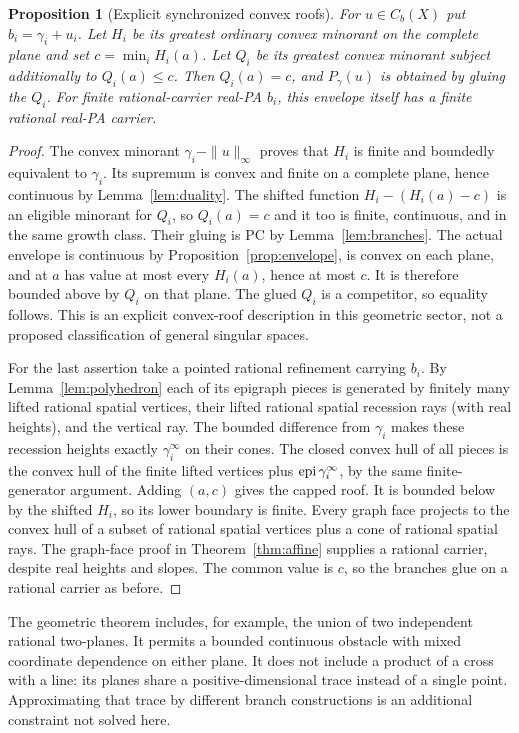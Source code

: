 \documentclass[11pt]{article}
\newtheorem{proposition}[theorem]{Proposition}
\theoremstyle{definition}\newtheorem{definition}[theorem]{Definition}
\theoremstyle{remark}\newtheorem{remark}[theorem]{Remark}
\begin{document}
\begin{proposition}[Explicit synchronized convex roofs]\label{prop:roofs}
For $u\in C_b(X)$ put $b_i=\gamma_i+u_i$. Let $H_i$ be its greatest ordinary convex minorant on the complete plane and set $c=\min_i H_i(a)$. Let $Q_i$ be its greatest convex minorant subject additionally to $Q_i(a)\leq c$. Then $Q_i(a)=c$, and $P_\gamma(u)$ is obtained by gluing the $Q_i$. For finite rational-carrier real-PA $b_i$, this envelope itself has a finite rational real-PA carrier.
\end{proposition}
\begin{proof}
The convex minorant $\gamma_i-\|u\|_\infty$ proves that $H_i$ is finite and boundedly equivalent to $\gamma_i$. Its supremum is convex and finite on a complete plane, hence continuous by Lemma~\ref{lem:duality}. The shifted function $H_i-(H_i(a)-c)$ is an eligible minorant for $Q_i$, so $Q_i(a)=c$ and it too is finite, continuous, and in the same growth class. Their gluing is PC by Lemma~\ref{lem:branches}. The actual envelope is continuous by Proposition~\ref{prop:envelope}, is convex on each plane, and at $a$ has value at most every $H_i(a)$, hence at most $c$. It is therefore bounded above by $Q_i$ on that plane. The glued $Q_i$ is a competitor, so equality follows. This is an explicit convex-roof description in this geometric sector, not a proposed classification of general singular spaces.

For the last assertion take a pointed rational refinement carrying $b_i$. By Lemma~\ref{lem:polyhedron} each of its epigraph pieces is generated by finitely many lifted rational spatial vertices, their lifted rational spatial recession rays (with real heights), and the vertical ray. The bounded difference from $\gamma_i$ makes these recession heights exactly $\gamma_i^\infty$ on their cones. The closed convex hull of all pieces is the convex hull of the finite lifted vertices plus $\operatorname{epi}\gamma_i^\infty$, by the same finite-generator argument. Adding $(a,c)$ gives the capped roof. It is bounded below by the shifted $H_i$, so its lower boundary is finite. Every graph face projects to the convex hull of a subset of rational spatial vertices plus a cone of rational spatial rays. The graph-face proof in Theorem~\ref{thm:affine} supplies a rational carrier, despite real heights and slopes. The common value is $c$, so the branches glue on a rational carrier as before.
\end{proof}

The geometric theorem includes, for example, the union of two independent rational two-planes. It permits a bounded continuous obstacle with mixed coordinate dependence on either plane. It does not include a product of a cross with a line: its planes share a positive-dimensional trace instead of a single point. Approximating that trace by different branch constructions is an additional constraint not solved here.
\end{document}
